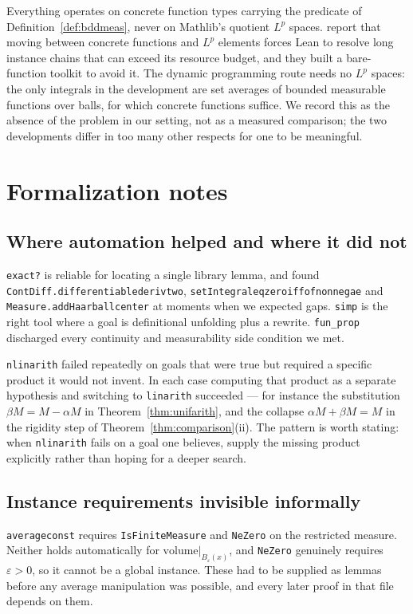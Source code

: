 \documentclass[11pt,reqno]{amsart}
\newcommand{\LEANREF}[1]{\texttt{\small\def\_{\textunderscore\allowbreak}#1}}
\newcommand{\eps}{\varepsilon}
\theoremstyle{plain}
\theoremstyle{definition}
\begin{document}
Everything operates on concrete function types carrying the predicate of
Definition~\ref{def:bddmeas}, never on Mathlib's quotient $L^p$ spaces.
\cite{AK26} report that moving between concrete functions and $L^p$ elements
forces Lean to resolve long instance chains that can exceed its resource
budget, and they built a bare-function toolkit to avoid it. The dynamic
programming route needs no $L^p$ spaces: the only integrals in the development
are set averages of bounded measurable functions over balls, for which concrete
functions suffice. We record this as the absence of the problem in our setting,
not as a measured comparison; the two developments differ in too many other
respects for one to be meaningful.

\section{Formalization notes}\label{sec:notes}

\subsection{Where automation helped and where it did not}
\texttt{exact?} is reliable for locating a single library lemma, and found
\LEANREF{ContDiff.differentiable\_deriv\_two},
\LEANREF{setIntegral\_eq\_zero\_iff\_of\_nonneg\_ae} and
\LEANREF{Measure.addHaar\_ball\_center} at moments when we expected gaps.
\texttt{simp} is the right tool where a goal is definitional unfolding plus a
rewrite. \texttt{fun\_prop} discharged every continuity and measurability side
condition we met.

\texttt{nlinarith} failed repeatedly on goals that were true but required a
specific product it would not invent. In each case computing that product as a
separate hypothesis and switching to \texttt{linarith} succeeded --- for
instance the substitution $\beta M = M - \alpha M$ in
Theorem~\ref{thm:unifarith}, and the collapse
$\alpha M + \beta M = M$ in the rigidity step of
Theorem~\ref{thm:comparison}(ii). The pattern is worth stating: when
\texttt{nlinarith} fails on a goal one believes, supply the missing product
explicitly rather than hoping for a deeper search.

\subsection{Instance requirements invisible informally}
\LEANREF{average\_const} requires \LEANREF{IsFiniteMeasure} and
\LEANREF{NeZero} on the restricted measure. Neither holds automatically for
$\mathrm{volume}|_{B_\eps(x)}$, and \LEANREF{NeZero} genuinely requires
$\eps>0$, so it cannot be a global instance. These had to be supplied as
lemmas before any average manipulation was possible, and every later proof in
that file depends on them.
\end{document}
